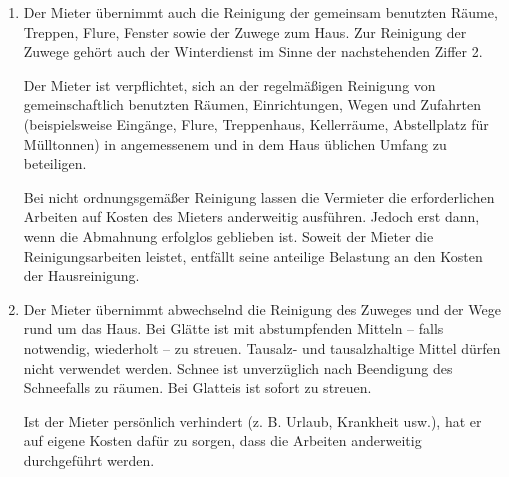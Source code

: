 \documentclass{scrreprt}[12pt,a4paper,twoside,duplex]
\begin{document}
\begin{contract}
	\begin{enumerate}
		\item Der Mieter übernimmt auch die Reinigung der gemeinsam benutzten Räume, Treppen, Flure, Fenster sowie der Zuwege zum Haus. Zur Reinigung der Zuwege gehört auch der Winterdienst im Sinne der nachstehenden Ziffer 2.

		Der Mieter ist verpflichtet, sich an der regelmäßigen Reinigung von gemeinschaftlich benutzten Räumen, Einrichtungen, Wegen und Zufahrten (beispielsweise Eingänge, Flure, Treppenhaus, Kellerräume, Abstellplatz für Mülltonnen) in angemessenem und in dem Haus üblichen Umfang zu beteiligen.

		Bei nicht ordnungsgemäßer Reinigung lassen die Vermieter die erforderlichen Arbeiten auf Kosten des Mieters anderweitig ausführen. Jedoch erst dann, wenn die Abmahnung erfolglos geblieben ist. Soweit der Mieter die Reinigungsarbeiten leistet, entfällt seine anteilige Belastung an den Kosten der Hausreinigung.

		\item Der Mieter übernimmt abwechselnd die Reinigung des Zuweges und der Wege rund um das Haus. Bei Glätte ist mit abstumpfenden Mitteln – falls notwendig, wiederholt – zu streuen. Tausalz- und tausalzhaltige Mittel dürfen nicht verwendet werden. Schnee ist unverzüglich nach Beendigung des Schneefalls zu räumen. Bei Glatteis ist sofort zu streuen.

		Ist der Mieter persönlich verhindert (z. B. Urlaub, Krankheit usw.), hat er auf eigene Kosten dafür zu sorgen, dass die Arbeiten anderweitig durchgeführt werden.
	\end{enumerate}
\end{contract}
\end{document}

